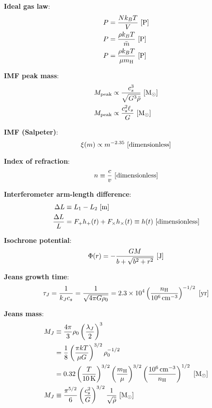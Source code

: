 \documentclass[a4paper,10pt]{article}
\begin{document}
{\noindent}\textbf{Ideal gas law}:
\begin{align*}
    P &= \frac{Nk_BT}{V} ~ [{\rm P}] \\
    P &= \frac{\rho k_BT}{\bar{m}} ~ [{\rm P}] \\
    P &= \frac{\rho k_BT}{\mu m_{\rm H}} ~ [{\rm P}]
\end{align*}

{\noindent}\textbf{IMF peak mass}:
\begin{align*}
    M_\mathrm{peak} &\propto \frac{c_s^3}{\sqrt{G^3\bar{\rho}}}  ~ [{\rm M_\odot}] \\
    M_\mathrm{peak} &\propto \frac{c_s^2\ell_s}{G} ~ [{\rm M_\odot}]
\end{align*}

{\noindent}\textbf{IMF (Salpeter)}:
\begin{align*}
    \xi(m) \propto m^{-2.35} ~ [{\rm dimensionless}]
\end{align*}

{\noindent}\textbf{Index of refraction}:
\begin{align*}
    n \equiv \frac{c}{v} ~ [{\rm dimensionless}]
\end{align*}

{\noindent}\textbf{Interferometer arm-length difference}:
\begin{align*}
    \Delta L &\equiv L_1 - L_2 ~ [{\rm m}] \\
    \frac{\Delta L}{L} &= F_+h_+(t) + F_\times h_\times(t) \equiv h(t) ~ [{\rm dimensionless}]
\end{align*}

{\noindent}\textbf{Isochrone potential}:
\begin{align*}
    \Phi(r) = - \frac{GM}{b + \sqrt{b^2+r^2}} ~ [{\rm J}]
\end{align*}

{\noindent}\textbf{Jeans growth time}:
\begin{align*}
    \tau_J = \frac{1}{k_Jc_s} = \frac{1}{\sqrt{4\pi G\rho_0}} = 2.3\times10^4 \left(\frac{n_{\rm H}}{10^6\,{\rm cm^{-3}}}\right)^{-1/2} ~ [{\rm yr}]
\end{align*}

{\noindent}\textbf{Jeans mass}:
\begin{align*}
    M_J &\equiv \frac{4\pi}{3}\rho_0 \left(\frac{\lambda_J}{2}\right)^3 \\
        &= \frac{1}{8} \left(\frac{\pi kT}{\mu G}\right)^{3/2} \rho_0^{-1/2} \\
        &= 0.32 \left(\frac{T}{10\,{\rm K}}\right)^{3/2} \left(\frac{m_{\rm H}}{\mu}\right)^{3/2} \left(\frac{10^6\,{\rm cm^{-3}}}{n_{\rm H}}\right)^{1/2} ~ [{\rm M_\odot}] \\
    M_J &\equiv \frac{\pi^{5/2}}{6}\left(\frac{c_s^2}{G}\right)^{3/2}\frac{1}{\sqrt{\bar{\rho}}} ~ [{\rm M_\odot}]
\end{align*}
\end{document}
